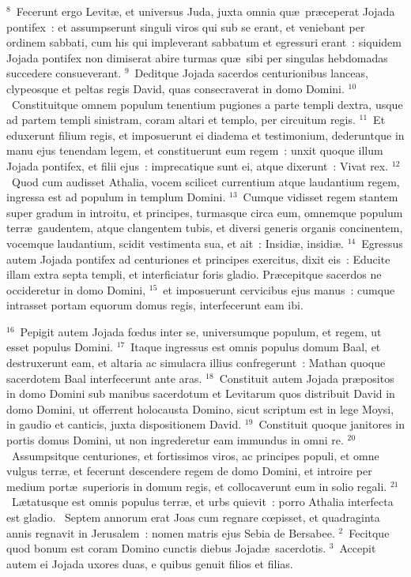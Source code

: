 ${}^{8}$~Fecerunt ergo Levit\ae , et universus Juda, juxta omnia qu\ae\ pr\ae ceperat Jojada pontifex~: et assumpserunt singuli viros qui sub se erant, et veniebant per ordinem sabbati, cum his qui impleverant sabbatum et egressuri erant~: siquidem Jojada pontifex non dimiserat abire turmas qu\ae\ sibi per singulas hebdomadas succedere consueverant.
${}^{9}$~Deditque Jojada sacerdos centurionibus lanceas, clypeosque et peltas regis David, quas consecraverat in domo Domini.
${}^{10}$~Constituitque omnem populum tenentium pugiones a parte templi dextra, usque ad partem templi sinistram, coram altari et templo, per circuitum regis.
${}^{11}$~Et eduxerunt filium regis, et imposuerunt ei diadema et testimonium, dederuntque in manu ejus tenendam legem, et constituerunt eum regem~: unxit quoque illum Jojada pontifex, et filii ejus~: imprecatique sunt ei, atque dixerunt~: Vivat rex.
${}^{12}$~Quod cum audisset Athalia, vocem scilicet currentium atque laudantium regem, ingressa est ad populum in templum Domini.
${}^{13}$~Cumque vidisset regem stantem super gradum in introitu, et principes, turmasque circa eum, omnemque populum terr\ae\ gaudentem, atque clangentem tubis, et diversi generis organis concinentem, vocemque laudantium, scidit vestimenta sua, et ait~: Insidi\ae , insidi\ae .
${}^{14}$~Egressus autem Jojada pontifex ad centuriones et principes exercitus, dixit eis~: Educite illam extra septa templi, et interficiatur foris gladio. Pr\ae cepitque sacerdos ne occideretur in domo Domini,
${}^{15}$~et imposuerunt cervicibus ejus manus~: cumque intrasset portam equorum domus regis, interfecerunt eam ibi.


${}^{16}$~Pepigit autem Jojada fœdus inter se, universumque populum, et regem, ut esset populus Domini.
${}^{17}$~Itaque ingressus est omnis populus domum Baal, et destruxerunt eam, et altaria ac simulacra illius confregerunt~: Mathan quoque sacerdotem Baal interfecerunt ante aras.
${}^{18}$~Constituit autem Jojada pr\ae positos in domo Domini sub manibus sacerdotum et Levitarum quos distribuit David in domo Domini, ut offerrent holocausta Domino, sicut scriptum est in lege Moysi, in gaudio et canticis, juxta dispositionem David.
${}^{19}$~Constituit quoque janitores in portis domus Domini, ut non ingrederetur eam immundus in omni re.
${}^{20}$~Assumpsitque centuriones, et fortissimos viros, ac principes populi, et omne vulgus terr\ae , et fecerunt descendere regem de domo Domini, et introire per medium port\ae\ superioris in domum regis, et collocaverunt eum in solio regali.
${}^{21}$~L\ae tatusque est omnis populus terr\ae , et urbs quievit~: porro Athalia interfecta est gladio.
~Septem annorum erat Joas cum regnare cœpisset, et quadraginta annis regnavit in Jerusalem~: nomen matris ejus Sebia de Bersabee.
${}^{2}$~Fecitque quod bonum est coram Domino cunctis diebus Jojad\ae\ sacerdotis.
${}^{3}$~Accepit autem ei Jojada uxores duas, e quibus genuit filios et filias.


